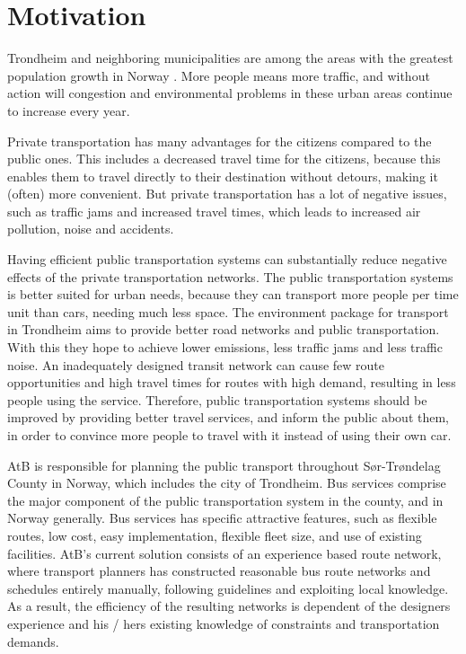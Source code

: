 \section{Motivation} 
\label{sec:motivation}

Trondheim and neighboring municipalities are among the areas with the greatest population growth in Norway \citep{website:miljopakken}. More people means more traffic, and without action will congestion and environmental problems in these urban areas continue to increase every year.

Private transportation has many advantages for the citizens compared to the public ones. This includes a decreased travel time for the citizens, because this enables them to travel directly to their destination without detours, making it (often) more convenient. But private transportation has a lot of negative issues, such as traffic jams and increased travel times, which leads to increased air pollution, noise and accidents. 

Having efficient public transportation systems can substantially reduce negative effects of the private transportation networks. The public transportation systems is better suited for urban needs, because they can transport more people per time unit than cars, needing much less space. The environment package \citep{website:miljopakken} for transport in Trondheim aims to provide better road networks and public transportation. With this they hope to achieve lower emissions, less traffic jams and less traffic noise. An inadequately designed transit network can cause few route opportunities and high travel times for routes with high demand, resulting in less people using the service. Therefore, public transportation systems should be improved by providing better travel services, and inform the public about them, in order to convince more people to travel with it instead of using their own car.

AtB\citet{website:atb} is responsible for planning the public transport throughout Sør-Trøndelag County in Norway, which includes the city of Trondheim. Bus services comprise the major component of the public transportation system in the county, and in Norway generally. Bus services has specific attractive features, such as flexible routes, low cost, easy implementation, flexible fleet size, and use of existing facilities. AtB's current solution consists of an experience based route network, where transport planners has constructed reasonable bus route networks and schedules entirely manually, following guidelines and exploiting local knowledge. As a result, the efficiency of the resulting networks is dependent of the designers experience and his / hers existing knowledge of constraints and transportation demands.

